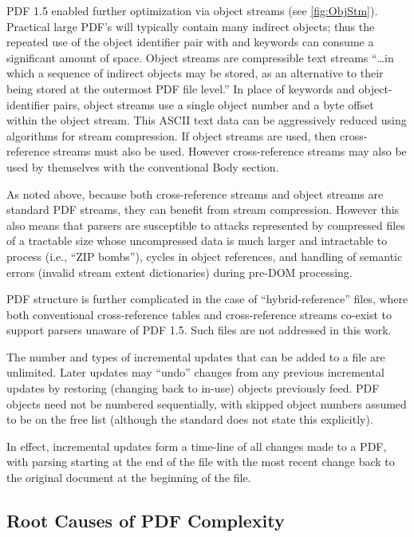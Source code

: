 PDF 1.5 enabled further optimization via object streams (see
\cref{fig:ObjStm}).
%
Practical large PDF's will typically contain many indirect objects;
%
thus the repeated use of the object identifier pair with 
and  keywords can consume a significant amount of space.
%
Object streams are compressible text streams ``\ldots in which a
sequence of indirect objects may be stored, as an alternative to their
being stored at the outermost PDF file level.''
%
In place of keywords and object-identifier pairs, object streams use a
single object number and a byte offset within the object stream.
%
This ASCII text data can be aggressively reduced using algorithms for
stream compression.
%
If object streams are used, then cross-reference streams must also be
used.
%
However cross-reference streams may also be used by themselves with
the conventional Body section.

As noted above, because both cross-reference streams and object
streams are standard PDF streams, they can benefit from stream
compression. However this also means that parsers are susceptible to
attacks represented by compressed files of a tractable size whose
uncompressed data is much larger and intractable to process (i.e.,
``ZIP bombs''), cycles in object references, and handling of semantic
errors (invalid stream extent dictionaries) during pre-DOM processing.

PDF structure is further complicated in the case of
``hybrid-reference'' files, where both conventional cross-reference
tables and cross-reference streams co-exist to support parsers unaware
of PDF 1.5.
%
Such files are not addressed in this work.

The number and types of incremental updates that can be added to a
file are unlimited.
%
Later updates may ``undo'' changes from any previous incremental
updates by restoring (changing back to in-use) objects previously
feed.
%
PDF objects need not be numbered sequentially, with skipped object
numbers assumed to be on the free list (although the standard does not
state this explicitly).

In effect, incremental updates form a time-line of all changes made to
a PDF, with parsing starting at the end of the file with the most
recent change back to the original document at the beginning of the
file.

\subsection{Root Causes of PDF Complexity}
\label{sec:rootcause}

